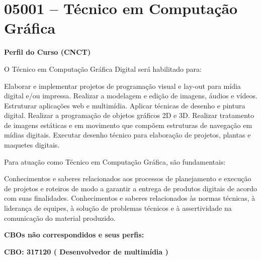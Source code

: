\documentclass[
]{article}
\begin{document}
\newpage
\section{ 05001 -- Técnico em Computação Gráfica }

\textbf{Perfil do Curso (CNCT)}

O Técnico em Computação Gráfica Digital será habilitado para:

Elaborar e implementar projetos de programação visual e lay-out para
mídia digital e/ou impressa. Realizar a modelagem e edição de imagens,
áudios e vídeos. Estruturar aplicações web e multimídia. Aplicar
técnicas de desenho e pintura digital. Realizar a programação de objetos
gráficos 2D e 3D. Realizar tratamento de imagens estáticas e em
movimento que compõem estruturas de navegação em mídias digitais.
Executar desenho técnico para elaboração de projetos, plantas e maquetes
digitais.

Para atuação como Técnico em Computação Gráfica, são fundamentais:

Conhecimentos e saberes relacionados aos processos de planejamento e
execução de projetos e roteiros de modo a garantir a entrega de produtos
digitais de acordo com suas finalidades. Conhecimentos e saberes
relacionados às normas técnicas, à liderança de equipes, à solução de
problemas técnicos e à assertividade na comunicação do material
produzido.

\textbf{CBOs não correspondidos e seus perfis:}

\textbf{CBO: 317120  ( Desenvolvedor de multimídia )}
\end{document}
